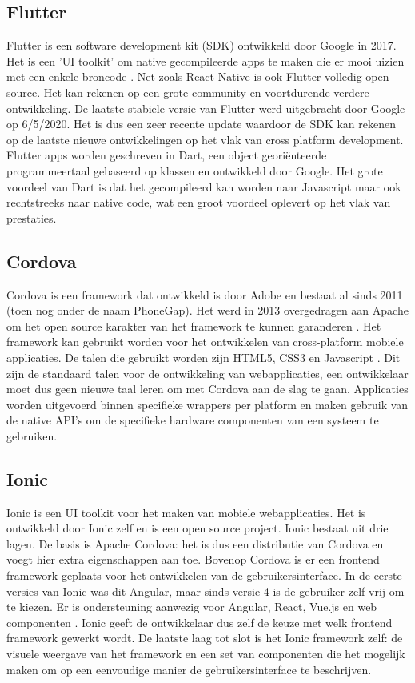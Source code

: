 \subsection{Flutter}
\label{subsec:Flutter}

Flutter is een software development kit (SDK) ontwikkeld door Google in 2017. Het is een 'UI toolkit' om native gecompileerde apps te maken die er mooi uizien met een enkele broncode \autocite{Google2020}. Net zoals React Native is ook Flutter volledig open source. Het kan rekenen op een grote community en voortdurende verdere ontwikkeling. De laatste stabiele versie van Flutter werd uitgebracht door Google op 6/5/2020. Het is dus een zeer recente update waardoor de SDK kan rekenen op de laatste nieuwe ontwikkelingen op het vlak van cross platform development. Flutter apps worden geschreven in Dart, een object georiënteerde programmeertaal gebaseerd op klassen en ontwikkeld door Google. Het grote voordeel van Dart is dat het gecompileerd kan worden naar Javascript maar ook rechtstreeks naar native code, wat een groot voordeel oplevert op het vlak van prestaties.

\subsection{Cordova}
\label{subsec:Cordova}

Cordova is een framework dat ontwikkeld is door Adobe en bestaat al sinds 2011 (toen nog onder de naam PhoneGap). Het werd in 2013 overgedragen aan Apache om het open source karakter van het framework te kunnen garanderen . Het framework kan gebruikt worden voor het ontwikkelen van cross-platform mobiele applicaties. De talen die gebruikt worden zijn HTML5, CSS3 en Javascript \autocite{Apache2020}. Dit zijn de standaard talen voor de ontwikkeling van webapplicaties, een ontwikkelaar moet dus geen nieuwe taal leren om met Cordova aan de slag te gaan. Applicaties worden uitgevoerd binnen specifieke wrappers per platform en maken gebruik van de native API's om de specifieke hardware componenten van een systeem te gebruiken.

\subsection{Ionic}
\label{subsec:Ionic}

Ionic is een UI toolkit voor het maken van mobiele webapplicaties. Het is ontwikkeld door Ionic zelf en is een open source project. Ionic bestaat uit drie lagen. De basis is Apache Cordova: het is dus een distributie van Cordova en voegt hier extra eigenschappen aan toe. Bovenop Cordova is er een frontend framework geplaats voor het ontwikkelen van de gebruikersinterface. In de eerste versies van Ionic was dit Angular, maar sinds versie 4 is de gebruiker zelf vrij om te kiezen. Er is ondersteuning aanwezig voor Angular, React, Vue.js en web componenten \autocite{Schiemann2019}. Ionic geeft de ontwikkelaar dus zelf de keuze met welk frontend framework gewerkt wordt. De laatste laag tot slot is het Ionic framework zelf: de visuele weergave van het framework en een set van componenten die het mogelijk maken om op een eenvoudige manier de gebruikersinterface te beschrijven.

